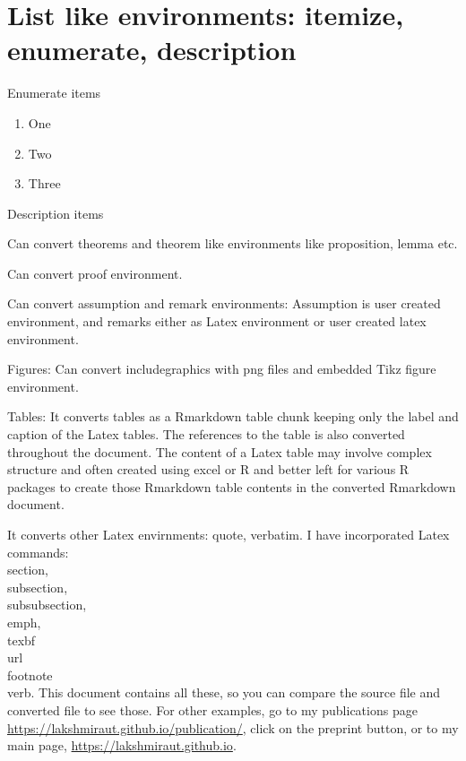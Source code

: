 \documentclass[12pt,svgnames]{article}
\begin{document}

\section{List like environments: itemize, enumerate, description}\label{sec6}

Enumerate items

\begin{enumerate}
\item One
\item Two
\item Three
\end{enumerate}

Description items

\begin{description} 
  \item Can convert theorems and theorem like environments like proposition, lemma etc.

  \item Can convert proof environment. 
  
  \item Can convert assumption and remark environments: Assumption is user created environment, and remarks either as Latex environment or user created latex environment.
   
  \item Figures: Can convert includegraphics with png files and embedded Tikz figure environment. 
  
  \item Tables: It converts tables as a Rmarkdown table chunk keeping only the label and caption of the Latex tables. The references to the table is also converted throughout the document.  The content of a Latex table may involve complex structure and often created using excel or R and better left for various R packages to create those Rmarkdown table contents in the converted Rmarkdown document.
  
  \item It converts other Latex envirnments: quote, verbatim. I have incorporated Latex commands:  \\section, \\subsection, \\subsubsection,  \\emph, \\texbf \\url \\footnote \\verb.  This document contains all these, so you can compare the source file and converted file to see those.  For other examples, go to my publications page \url{https://lakshmiraut.github.io/publication/}, click on the preprint button, or to my main page, \url{https://lakshmiraut.github.io}.
  
\end{description} 
\end{document}
